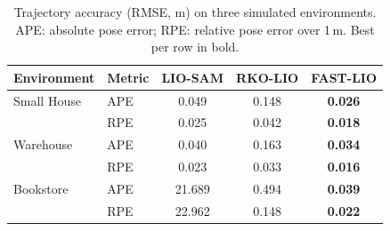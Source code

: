 \begin{table}[t]
\centering
\caption{Trajectory accuracy (RMSE, m) on three simulated environments. APE: absolute pose error; RPE: relative pose error over 1\,m. Best per row in bold.}
\label{tab:sim_comparison}
\begin{tabular}{llccc}
\toprule
Environment & Metric & LIO-SAM & RKO-LIO & FAST-LIO \\
\midrule
Small House & APE & 0.049 & 0.148 & \textbf{0.026} \\
 & RPE & 0.025 & 0.042 & \textbf{0.018} \\
\midrule
Warehouse & APE & 0.040 & 0.163 & \textbf{0.034} \\
 & RPE & 0.023 & 0.033 & \textbf{0.016} \\
\midrule
Bookstore & APE & 21.689 & 0.494 & \textbf{0.039} \\
 & RPE & 22.962 & 0.148 & \textbf{0.022} \\
\bottomrule
\end{tabular}
\end{table}
